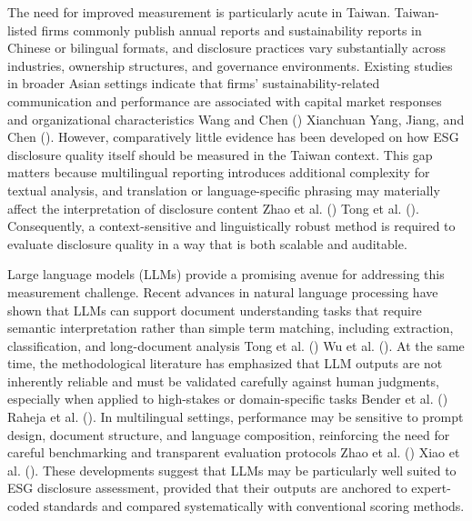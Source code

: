 \documentclass[
  12pt,
]{article}
\begin{document}
The need for improved measurement is particularly acute in Taiwan.
Taiwan-listed firms commonly publish annual reports and sustainability
reports in Chinese or bilingual formats, and disclosure practices vary
substantially across industries, ownership structures, and governance
environments. Existing studies in broader Asian settings indicate that
firms' sustainability-related communication and performance are
associated with capital market responses and organizational
characteristics Wang and Chen () Xianchuan
Yang, Jiang, and Chen (). However,
comparatively little evidence has been developed on how ESG disclosure
quality itself should be measured in the Taiwan context. This gap
matters because multilingual reporting introduces additional complexity
for textual analysis, and translation or language-specific phrasing may
materially affect the interpretation of disclosure content Zhao et al.
() Tong et al.
(). Consequently, a context-sensitive and
linguistically robust method is required to evaluate disclosure quality
in a way that is both scalable and auditable.

Large language models (LLMs) provide a promising avenue for addressing
this measurement challenge. Recent advances in natural language
processing have shown that LLMs can support document understanding tasks
that require semantic interpretation rather than simple term matching,
including extraction, classification, and long-document analysis Tong et
al. () Wu et al.
(). At the same time, the methodological
literature has emphasized that LLM outputs are not inherently reliable
and must be validated carefully against human judgments, especially when
applied to high-stakes or domain-specific tasks Bender et al.
() Raheja et al.
(). In multilingual settings, performance
may be sensitive to prompt design, document structure, and language
composition, reinforcing the need for careful benchmarking and
transparent evaluation protocols Zhao et al.
() Xiao et al.
(). These developments suggest that LLMs
may be particularly well suited to ESG disclosure assessment, provided
that their outputs are anchored to expert-coded standards and compared
systematically with conventional scoring methods.
\end{document}

